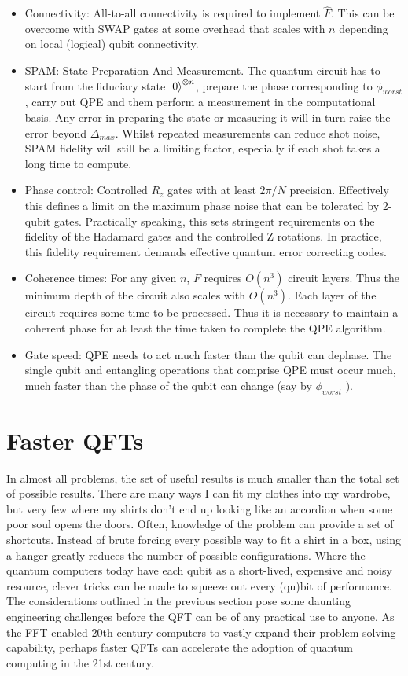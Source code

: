 \begin{itemize}
   \item Connectivity: All-to-all connectivity is required to implement $\hat{F}$. This can be overcome with SWAP gates at some overhead that scales with $n$ depending on local (logical) qubit connectivity.
   \item SPAM: State Preparation And Measurement. The quantum circuit has to start from the fiduciary state $\ket{0}^{\otimes n}$, prepare the phase corresponding to $\phi_{worst}$, carry out QPE and them perform a measurement in the computational basis. Any error in preparing the state or measuring it will in turn raise the error beyond $\Delta_{max}$. Whilst repeated measurements can reduce shot noise, SPAM fidelity will still be a limiting factor, especially if each shot takes a long time to compute.
   \item Phase control: Controlled $R_z$ gates with at least $2\pi/N$ precision. Effectively this defines a limit on the maximum phase noise that can be tolerated by 2-qubit gates. Practically speaking, this sets stringent requirements on the fidelity of the Hadamard gates and the controlled Z rotations. In practice, this fidelity requirement demands effective quantum error correcting codes.
   \item Coherence times: For any given $n$, $F$ requires $O(n^3)$ circuit layers. Thus the minimum depth of the circuit also scales with $O(n^3)$. Each layer of the circuit requires some time to be processed. Thus it is necessary to maintain a coherent phase for at least the time taken to complete the QPE algorithm.
   \item Gate speed: QPE needs to act much faster than the qubit can dephase. The single qubit and entangling operations that comprise QPE must occur much, much faster than the phase of the qubit can change (say by $\phi_{worst}$ ).

\end{itemize}

\section{Faster QFTs}

In almost all problems, the set of useful results is much smaller than the total set of possible results. There are many ways I can fit my clothes into my wardrobe, but very few where my shirts don't end up looking like an accordion when some poor soul opens the doors. Often, knowledge of the problem can provide a set of shortcuts. Instead of brute forcing every possible way to fit a shirt in a box, using a hanger greatly reduces the number of possible configurations. Where the quantum computers today have each qubit as a short-lived, expensive and noisy resource, clever tricks can be made to squeeze out every (qu)bit of performance. The considerations outlined in the previous section pose some daunting engineering challenges before the QFT can be of any practical use to anyone. As the FFT enabled 20th century computers to vastly expand their problem solving capability, perhaps faster QFTs can accelerate the adoption of quantum computing in the 21st century.  

